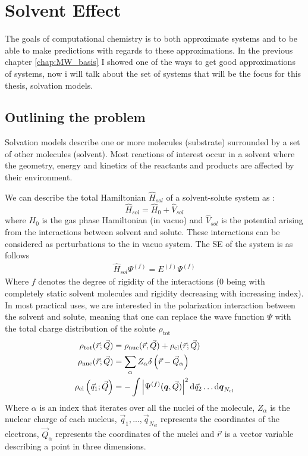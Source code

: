 \documentclass[../master_thesis.tex]{subfiles}
\begin{document}
\chapter{Solvent Effect}\label{chap:Solvent_effect}
The goals of computational chemistry is to both approximate systems and to be
able to make predictions with regards to these approximations. In the previous
chapter \ref{chap:MW_basis} I showed one of the ways to get good approximations of systems, now i
will talk about the set of systems that will be the focus for this thesis,
solvation models.
\section{Outlining the problem}
Solvation models describe one or more molecules (substrate) surrounded by
a set of other molecules (solvent). Most reactions of interest occur in a
solvent where the geometry, energy and kinetics of the reactants and products
are affected by their environment\cite{Mennucci:2018}.

We can describe the total Hamiltonian $\hat{H}_{sol}$ of a solvent-solute system as
\cite{Tomasi:1994wt}:
\begin{equation}\label{eq:Hsolvent}
  \hat{H}_{sol} = \hat{H}_0 + \hat{V}_{sol}
\end{equation}
where $H_0$ is the gas phase Hamiltonian (in vacuo) and $\hat{V}_{sol}$ is the
potential arising from the interactions between solvent and solute. These
interactions can be considered as perturbations to the in vacuo system.
The \ac{SE} of the system is as follows \cite{Tomasi:1994wt}
\begin{align}\label{eq:solSE}
  \hat{H}_{sol}\Psi^{(f)} = E^{(f)}\Psi^{(f)}
\end{align}
Where $f$ denotes the degree of  rigidity of the interactions (0 being with
completely static solvent molecules and rigidity decreasing with increasing
index). In most practical uses, we are interested in the polarization interaction
between the solvent and solute, meaning that one can replace the wave function $\Psi$ with the
total charge distribution of the solute $\rho_{\mathrm{tot}}$
\cite{Tomasi:1994wt}
\begin{align}
  \begin{split}\mathbb{}
      \rho_{\mathrm{tot}}(\vec{r} ; \vec{Q}) &=
      \rho_{\mathrm{nuc}}(\vec{r}, \vec{Q})
      + \rho_{\mathrm{el}}(\vec{r} ; \vec{Q}) \\
      \rho_{\mathrm{nuc}}(\vec{r} ; \vec{Q}) &=
      \sum_{\alpha} Z_{\alpha} \delta\left(\vec{r}
      - \vec{Q}_{\alpha}\right) \\
      \rho_{\mathrm{el}}\left(\vec{q}_{1} ; \vec{Q}\right) &=
      -\int\left|\Psi^{(f)}(\boldsymbol{q}, \vec{Q})\right|^{2}
      \mathrm{d}\vec{q}_{2} \ldots \mathrm{d}\boldsymbol{q}_{N_{\mathrm{el}}}
  \end{split}
\end{align}
Where $\alpha$ is an index that iterates over all the nuclei of the molecule,
$Z_{\alpha}$ is the nuclear charge of each nucleus, $\vec{q}_1, ..., \vec{q}_{N_{el}}$
represents the coordinates of the electrons, $\vec{Q}_{\alpha}$ represents the
coordinates of the nuclei and $\vec{r}$ is a vector variable describing a point
in three dimensions.
\end{document}
